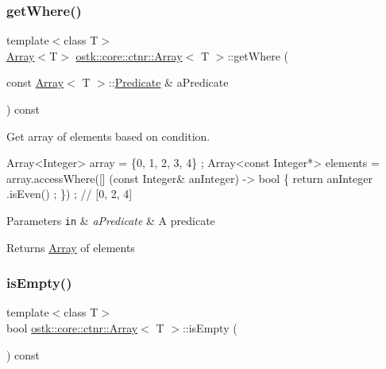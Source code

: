 \subsubsection{\texorpdfstring{get\+Where()}{getWhere()}}
{\footnotesize\ttfamily template$<$class T$>$ \\
\hyperlink{classostk_1_1core_1_1ctnr_1_1_array}{Array}$<$T$>$ \hyperlink{classostk_1_1core_1_1ctnr_1_1_array}{ostk\+::core\+::ctnr\+::\+Array}$<$ T $>$\+::get\+Where (\begin{DoxyParamCaption}\item[{const \hyperlink{classostk_1_1core_1_1ctnr_1_1_array}{Array}$<$ T $>$\+::\hyperlink{classostk_1_1core_1_1ctnr_1_1_array_a7c04a98dd10cd625acf96addd312d0af}{Predicate} \&}]{a\+Predicate }\end{DoxyParamCaption}) const}



Get array of elements based on condition. 


\begin{DoxyCode}
Array<Integer> array = \{0, 1, 2, 3, 4\} ;
Array<const Integer*> elements = array.accessWhere([] (\textcolor{keyword}{const} Integer& anInteger) -> \textcolor{keywordtype}{bool} \{ \textcolor{keywordflow}{return} anInteger
      .isEven() ; \}) ; \textcolor{comment}{// [0, 2, 4]}
\end{DoxyCode}



\begin{DoxyParams}[1]{Parameters}
\mbox{\tt in}  & {\em a\+Predicate} & A predicate \\
\hline
\end{DoxyParams}
\begin{DoxyReturn}{Returns}
\hyperlink{classostk_1_1core_1_1ctnr_1_1_array}{Array} of elements 
\end{DoxyReturn}
\mbox{\label{classostk_1_1core_1_1ctnr_1_1_array_a8250cd3b1e3dc9b80d5d3d1ad360a5bb}} 
\subsubsection{\texorpdfstring{is\+Empty()}{isEmpty()}}
{\footnotesize\ttfamily template$<$class T$>$ \\
bool \hyperlink{classostk_1_1core_1_1ctnr_1_1_array}{ostk\+::core\+::ctnr\+::\+Array}$<$ T $>$\+::is\+Empty (\begin{DoxyParamCaption}{ }\end{DoxyParamCaption}) const}



